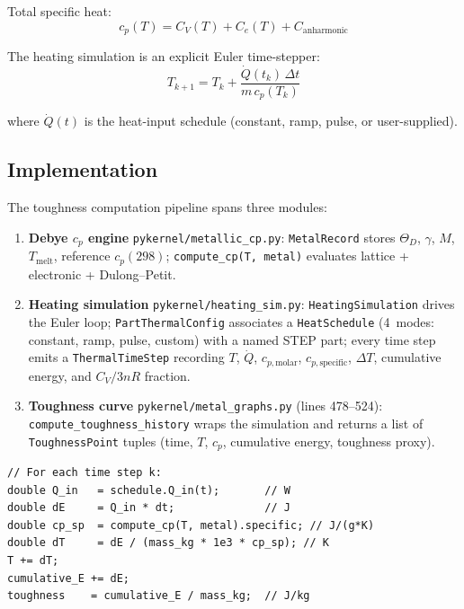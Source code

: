 \documentclass[11pt,a4paper]{article}
\begin{document}
Total specific heat:
\begin{equation}
  c_{p}(T) = C_{V}(T) + C_{e}(T) + C_{\text{anharmonic}}
  \label{eq:cptotal}
\end{equation}

The heating simulation is an explicit Euler time-stepper:
\begin{equation}
  T_{k+1} = T_{k} + \frac{\dot{Q}(t_{k})\,\Delta t}{m\,c_{p}(T_{k})}
  \label{eq:euler_heat}
\end{equation}

where $\dot{Q}(t)$ is the heat-input schedule (constant, ramp, pulse, or
user-supplied).

\subsection{Implementation}

The toughness computation pipeline spans three modules:

\begin{enumerate}
  \item \textbf{Debye $c_{p}$ engine} \texttt{pykernel/metallic\_cp.py}:
        \texttt{MetalRecord} stores $\Theta_D$, $\gamma$, $M$, $T_{\text{melt}}$,
        reference $c_{p}(298)$; \texttt{compute\_cp(T, metal)} evaluates
        lattice + electronic + Dulong--Petit.
  \item \textbf{Heating simulation} \texttt{pykernel/heating\_sim.py}:
        \texttt{HeatingSimulation} drives the Euler loop;
        \texttt{PartThermalConfig} associates a \texttt{HeatSchedule}
        (4~modes: constant, ramp, pulse, custom) with a named STEP part;
        every time step emits a \texttt{ThermalTimeStep} recording
        $T$, $\dot{Q}$, $c_{p,\text{molar}}$, $c_{p,\text{specific}}$,
        $\Delta T$, cumulative energy, and $C_V/3nR$ fraction.
  \item \textbf{Toughness curve} \texttt{pykernel/metal\_graphs.py}
        (lines 478--524): \texttt{compute\_toughness\_history} wraps the
        simulation and returns a list of \texttt{ToughnessPoint} tuples
        (time, $T$, $c_{p}$, cumulative energy, toughness proxy).
\end{enumerate}

\begin{lstlisting}[style=cpp,title={\textbf{C++ data flow concept (mirrored in Python)}}]
// For each time step k:
double Q_in   = schedule.Q_in(t);       // W
double dE     = Q_in * dt;              // J
double cp_sp  = compute_cp(T, metal).specific; // J/(g*K)
double dT     = dE / (mass_kg * 1e3 * cp_sp); // K
T += dT;
cumulative_E += dE;
toughness    = cumulative_E / mass_kg;  // J/kg
\end{lstlisting}
\end{document}
